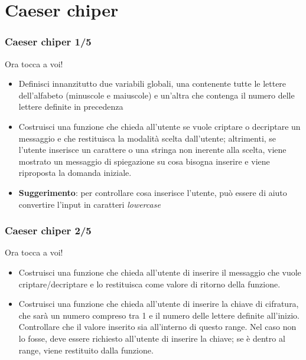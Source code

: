 \documentclass{beamer}
\begin{document}
\section{Caeser chiper}

\begin{frame}[fragile]
\frametitle{Caeser chiper 1/5}
\begin{block}{Ora tocca a voi!}
	\begin{itemize}
		\item Definisci innanzitutto due variabili globali, una contenente tutte le lettere dell'alfabeto (minuscole e maiuscole) e un'altra che contenga il numero delle lettere definite in precedenza
		\item Costruisci una funzione che chieda all'utente se vuole criptare o decriptare un messaggio e che restituisca la modalità scelta dall'utente; altrimenti, se l'utente inserisce un carattere o una stringa non inerente alla scelta, viene mostrato un messaggio di spiegazione su cosa bisogna inserire e viene riproposta la domanda iniziale.
		\item \textbf{Suggerimento}: per controllare cosa inserisce l'utente, può essere di aiuto convertire l'input in caratteri \textit{lowercase} 
	\end{itemize}
\end{block}
\end{frame}

\begin{frame}[fragile]
\frametitle{Caeser chiper 2/5}
\begin{block}{Ora tocca a voi!}
	\begin{itemize}
		\item Costruisci una funzione che chieda all'utente di inserire il messaggio che vuole criptare/decriptare e lo restituisca come valore di ritorno della funzione.
		\item Costruisci una funzione che chieda all'utente di inserire la chiave di cifratura, che sarà un numero compreso tra 1 e il numero delle lettere definite all'inizio. Controllare che il valore inserito sia all'interno di questo range. Nel caso non lo fosse, deve essere richiesto all'utente di inserire la chiave; se è dentro al range, viene restituito dalla funzione.
	\end{itemize}
\end{block}
\end{frame}
\end{document}
